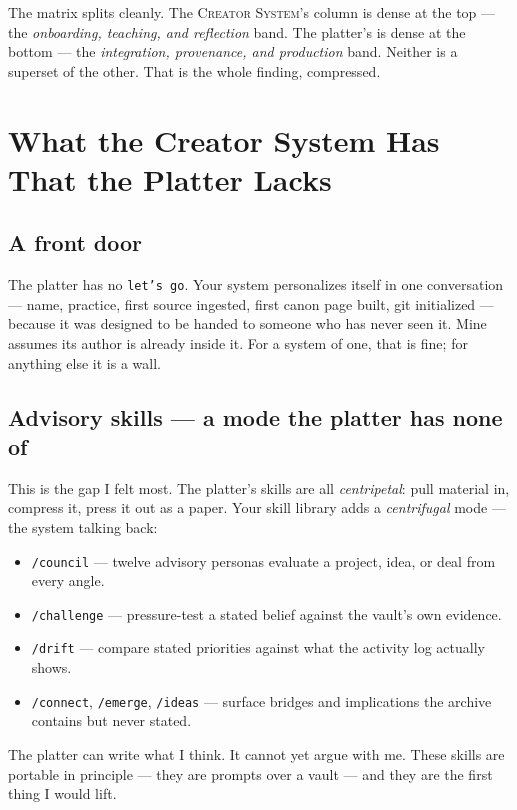 \documentclass[10pt,letterpaper,twocolumn]{article}
\newcommand{\cs}{\textsc{Creator System}}
\begin{document}
\vspace{0.4em}
\noindent The matrix splits cleanly. The \cs{}'s column is dense at the top --- the \emph{onboarding, teaching, and reflection} band. The platter's is dense at the bottom --- the \emph{integration, provenance, and production} band. Neither is a superset of the other. That is the whole finding, compressed.


\section{What the Creator System Has That the Platter Lacks}
\label{sec:cs-only}

\subsection{A front door}
The platter has no \texttt{let's go}. Your system personalizes itself in one conversation --- name, practice, first source ingested, first canon page built, git initialized --- because it was designed to be handed to someone who has never seen it. Mine assumes its author is already inside it. For a system of one, that is fine; for anything else it is a wall.

\subsection{Advisory skills --- a mode the platter has none of}
This is the gap I felt most. The platter's skills are all \emph{centripetal}: pull material in, compress it, press it out as a paper. Your skill library adds a \emph{centrifugal} mode --- the system talking back:
\begin{itemize}
  \item \texttt{/council} --- twelve advisory personas evaluate a project, idea, or deal from every angle.
  \item \texttt{/challenge} --- pressure-test a stated belief against the vault's own evidence.
  \item \texttt{/drift} --- compare stated priorities against what the activity log actually shows.
  \item \texttt{/connect}, \texttt{/emerge}, \texttt{/ideas} --- surface bridges and implications the archive contains but never stated.
\end{itemize}
The platter can write what I think. It cannot yet argue with me. These skills are portable in principle --- they are prompts over a vault --- and they are the first thing I would lift.
\end{document}
